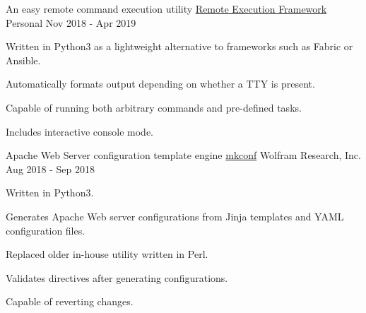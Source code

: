 

\begin{cventries}

  \cventry
    {An easy remote command execution utility} %
    {\href{https://github.com/HarrisonTotty/remote-framework}{Remote Execution Framework}} %
    {Personal} %
    {Nov 2018 - Apr 2019} %
    {
      \begin{cvitems} %
        \item {Written in Python3 as a lightweight alternative to frameworks such as Fabric or Ansible.}
        \item {Automatically formats output depending on whether a TTY is present.}
        \item {Capable of running both arbitrary commands and pre-defined tasks.}
        \item {Includes interactive console mode.}
      \end{cvitems}
    }

  \cventry
    {Apache Web Server configuration template engine} %
    {\href{https://github.com/HarrisonTotty/mkconf}{mkconf}} %
    {Wolfram Research, Inc.} %
    {Aug 2018 - Sep 2018} %
    {
      \begin{cvitems} %
        \item {Written in Python3.}
        \item {Generates Apache Web server configurations from Jinja templates and YAML configuration files.}
        \item {Replaced older in-house utility written in Perl.}
        \item {Validates directives after generating configurations.}
        \item {Capable of reverting changes.}
      \end{cvitems}
    }

\end{cventries}
